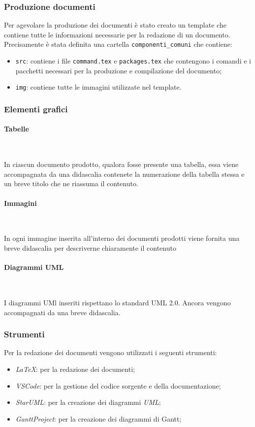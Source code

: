 \subsubsection{Produzione documenti}
Per agevolare la produzione dei documenti è stato creato un template che contiene tutte le informazioni necessarie per la redazione di un documento.\\
Precisamente è stata definita una cartella \texttt{componenti\_comuni} che contiene:
\begin{itemize}
    \item \texttt{src}: contiene i file \texttt{command.tex} e \texttt{packages.tex} che contengono i comandi e i pacchetti necessari per la produzione e compilazione del documento;
    \item \texttt{img}: contiene tutte le immagini utilizzate nel template.
\end{itemize}

\subsubsection{Elementi grafici}
\paragraph{Tabelle} ~

In ciascun documento prodotto, qualora fosse presente una tabella, essa viene accompagnata da una didascalia contenete la numerazione della tabella stessa e un breve titolo che ne riassuma il contenuto.\\

\paragraph{Immagini} ~

In ogni immagine inserita all'interno dei documenti prodotti viene fornita una breve didascalia per descriverne chiaramente il contenuto

\paragraph{Diagrammi UML} ~

I diagrammi UMl inseriti rispettano lo standard UML 2.0. Ancora vengono accompagnati da una breve didascalia.

\subsubsection{Strumenti}
Per la redazione dei documenti vengono utilizzati i seguenti strumenti:
\begin{itemize}
    \item \textit{LaTeX}: per la redazione dei documenti;
    \item \textit{VSCode}: per la gestione del codice sorgente e della documentazione;
    \item \textit{StarUML}: per la creazione dei diagrammi \textit{UML};
    \item \textit{GanttProject}: per la creazione dei diagrammi di Gantt;
\end{itemize}

